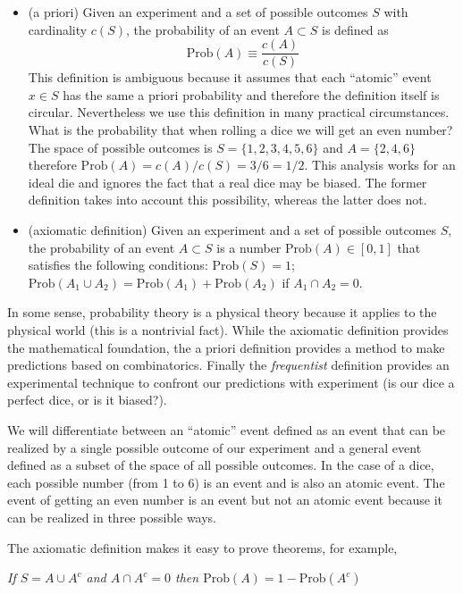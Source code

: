 \documentclass[justified, sixbynine]{tufte-book}
\theoremstyle{plain}%
\newtheorem * {corollary}{Corollary}
\theoremstyle{definition}
\theoremstyle{remark}
\newtheorem * {remark}{Remark}
\newtheorem * {note}{Note}
\begin{document}
\begin{fullwidth}
\begin{itemize}
\item  (a priori) Given an experiment and a set of possible outcomes $S$
with cardinality $c(S)$, the probability of an event $A\subset S$ is defined
as
\begin{equation}
\textrm{Prob}(A)\equiv \frac{c(A)}{c(S)}
\end{equation}
This definition is ambiguous because it assumes that each ``atomic'' event $%
x\in S$ has the same a priori probability and therefore the definition
itself is circular. Nevertheless we use this definition in many practical
circumstances. What is the probability that when rolling a dice we will get an even
number? The space of possible outcomes is $S=\{1, 2, 3, 4, 5, 6\}$ and $A=\{2, 4, 6\}
$ therefore $\textrm{Prob}(A)=c(A)/c(S)=3/6=1/2$. This analysis works for an ideal die
and ignores the fact that a real dice may be biased. The former definition
takes into account this possibility, whereas the latter does not.

\item  (axiomatic definition) Given an experiment and a set of possible
outcomes $S$, the probability of an event $A\subset S$ is a number $\textrm{Prob}(A)\in
[0, 1]$ that satisfies the following conditions: $\textrm{Prob}(S)=1$; $\textrm{Prob}(A_1\cup
A_2)=\textrm{Prob}(A_1)+\textrm{Prob}(A_2)$ if $A_1\cap A_2=0$.
\end{itemize}

In some sense, probability theory is a physical theory because it applies to
the physical world (this is a nontrivial fact). While the axiomatic
definition provides the mathematical foundation, the a priori
definition provides a method to make predictions based on combinatorics.
Finally the {\em frequentist} definition provides an experimental
technique to confront our predictions with experiment (is our dice a perfect
dice, or is it biased?).

We will differentiate between an ``atomic'' event defined as an event that
can be realized by a single possible outcome of our experiment and a general
event defined as a subset of the space of all possible outcomes. In the case
of a dice, each possible number (from 1 to 6) is an event and is also an
atomic event. The event of getting an even number is an event but not an
atomic event because it can be realized in three possible ways.

The axiomatic definition makes it easy to prove theorems, for example,

{\it If $S=A\cup A^c$ and $A\cap A^c=0$ then $\textrm{Prob}(A)=1-\textrm{Prob}(A^c)$}


\end{fullwidth}
\end{document}
